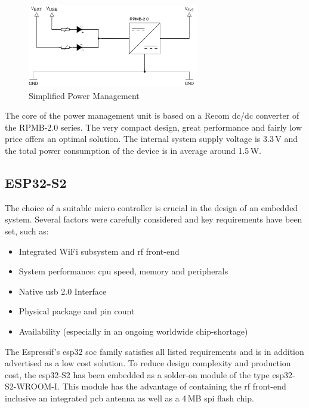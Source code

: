 \begin{figure}
\vspace{-0.6cm}
\includegraphics[width=7.5cm]{images/power}
\vspace{-0.4cm}
\caption{Simplified Power Management}
\label{fig:simplified-power}
\end{figure} 
The core of the power management unit is based on a Recom \acrshort{dc}/\acrshort{dc} converter of the RPMB-2.0 series. The very compact design, great performance and fairly low price offers an optimal solution. The internal system supply voltage is 3.3\,V and the total power consumption of the device is in average around 1.5\,W.
\clearpage

\subsection{ESP32-S2} \label{ESP32-S2}
The choice of a suitable micro controller is crucial in the design of an embedded system. Several factors were carefully considered and key requirements have been set, such as:

\begin{itemize}
		\item Integrated WiFi subsystem and \acrshort{rf} front-end
		\item System performance: \acrshort{cpu} speed, memory and peripherals
		\item Native \acrshort{usb} 2.0 Interface
		\item Physical package and pin count
		\item Availability (especially in an ongoing worldwide chip-shortage)
\end{itemize}

The Espressif's \gls{esp32} \acrfull{soc} family satisfies all listed requirements and is in addition advertised as a low cost solution.\newline
To reduce design complexity and production cost, the \gls{esp32}-S2 has been embedded as a solder-on module of the type \gls{esp32}-S2-WROOM-I. This module has the advantage of containing the \acrshort{rf} front-end inclusive an integrated \acrshort{pcb} antenna as well as a 4\,MB \acrshort{spi} flash chip.

